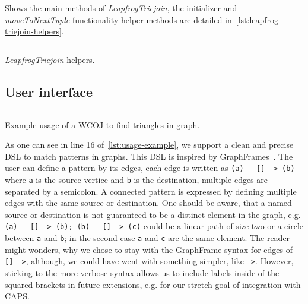 \begin{listing}[H]
    \inputminted[mathescape, linenos=true]{scala}{code/LeapfrogTriejoinIdiomatic.scala}
    \caption{Shows the main methods of \textit{LeapfrogTriejoin}, the initializer and \textit{moveToNextTuple} functionality
    helper methods are detailed in~\cref{lst:leapfrog-triejoin-helpers}.}
    \label{lst:leapfrog-triejoin}
\end{listing}

\begin{listing}[H]
    \inputminted{scala}{code/LeapfrogTriejoinHelpers.scala}
    \caption{\textit{LeapfrogTriejoin} helpers.}
    \label{lst:leapfrog-triejoin-helpers}
\end{listing}





\subsection{User interface}\label{subsec:user-interface}
\begin{listing}[H]
    \inputminted{scala}{code/usage-example.scala}
    \caption{Example usage of a WCOJ to find triangles in graph.}
    \label{lst:usage-example}
\end{listing}

As one can see in line 16 %
of~\cref{lst:usage-example}, we support a clean and precise DSL to match patterns in graphs.
This DSL is inspired by GraphFrames~\cite{graph-frames}.
The user can define a pattern by its edges, each edge is written as \texttt{(a) - [] -> (b)} where \texttt{a} is the
source vertice and \texttt{b} is the destination, multiple edges are separated by a semicolon.
A connected pattern is expressed by defining multiple edges with the same source or destination.
One should be aware, that a named source or destination is not guaranteed to be a distinct element in the graph,
e.g. \texttt{(a) - [] -> (b); (b) - [] -> (c)} could be a linear path of size two or a circle between \texttt{a} and
\texttt{b}; in the second case \texttt{a} and \texttt{c} are the same element.
The reader might wonders, why we chose to stay with the GraphFrame syntax for edges of
\texttt{- [] ->}, although, we could have went with something simpler, like \texttt{->}.
However, sticking to the more verbose syntax allows us to include labels inside of the squared brackets
in future extensions, e.g. for our stretch goal of integration with CAPS.

